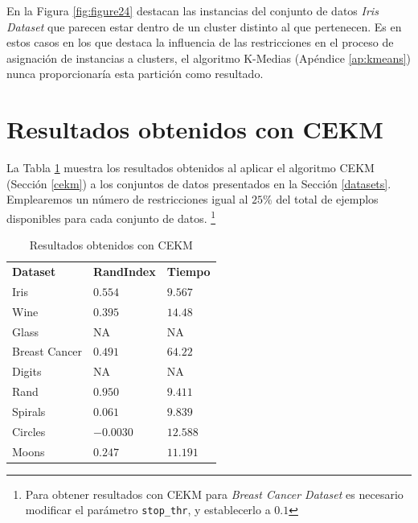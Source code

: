 En la Figura \ref{fig:figure24} destacan las instancias del conjunto de datos \textit{Iris Dataset} que parecen estar dentro de un cluster distinto al que pertenecen. Es en estos casos en los que destaca la influencia de las restricciones en el proceso de asignación de instancias a clusters, el algoritmo K-Medias (Apéndice \ref{ap:kmeans}) nunca proporcionaría esta partición como resultado.

\clearpage

\section{Resultados obtenidos con CEKM}

La Tabla \ref{tab:tabla8} muestra los resultados obtenidos al aplicar el algoritmo \acf{CEKM} (Sección \ref{cekm}) a los conjuntos de datos presentados en la Sección \ref{datasets}. Emplearemos un número de restricciones igual al $25\%$ del total de ejemplos disponibles para cada conjunto de datos. \footnote{Para obtener resultados con \acs{CEKM} para \textit{Breast Cancer Dataset} es necesario modificar el parámetro \texttt{stop\_thr}, y establecerlo a $0.1$ }

\begin{table}[!h]
	\centering
	\setlength{\arrayrulewidth}{1mm}
	\setlength{\tabcolsep}{10pt}
	\renewcommand{\arraystretch}{0.9}
	
	\begin{tabular}{ >{\centering\arraybackslash}m{2.5cm}  >{\centering\arraybackslash}m{1.8cm}>{\centering\arraybackslash}m{1.5cm}}
		\hline
		\rowcolor{black}
		\multicolumn{3}{c}{\bf \color{white}{Resultados obtenidos con CEKM}}\\
		\hline
		\rowcolor{gray!50}
		\textbf{Dataset} & \textbf{RandIndex} & \textbf{Tiempo}  \\
		Iris & $0.554$ & $9.567$  \\
		Wine & $0.395$ & $14.48$  \\
		Glass & NA & NA  \\
		Breast Cancer & $0.491$ & $64.22$  \\
		Digits & NA & NA  \\
		Rand & $0.950$ & $9.411$  \\
		Spirals & $0.061$ & $9.839$  \\
		Circles & $-0.0030$ & $12.588$  \\
		Moons & $0.247$ & $11.191$  \\
		\hline
		
	\end{tabular}
	\caption{Resultados obtenidos con \acs{CEKM}}
	\label{tab:tabla8}
\end{table}

